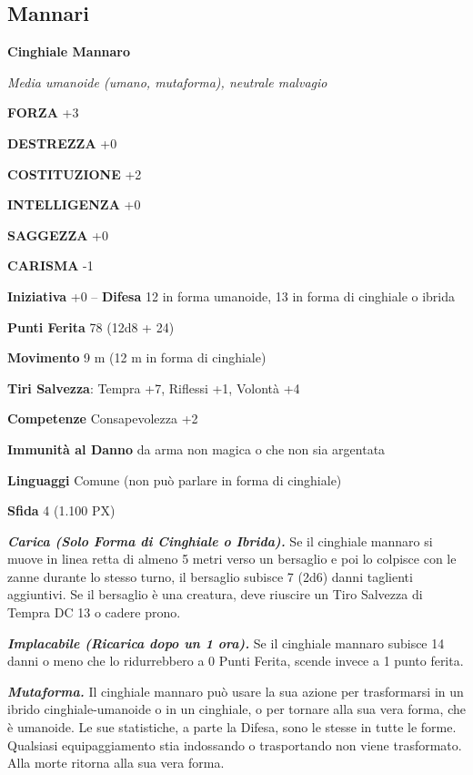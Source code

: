 \begin{multicols}{2}
\subsection{Mannari}

\medskip{}\textbf{Cinghiale Mannaro}

\textit{Media umanoide (umano, mutaforma), neutrale malvagio}

\textbf{FORZA} +3

\textbf{DESTREZZA} +0

\textbf{COSTITUZIONE} +2

\textbf{INTELLIGENZA} +0

\textbf{SAGGEZZA} +0

\textbf{CARISMA} -1

\textbf{Iniziativa} +0 -- \textbf{Difesa} 12 in forma umanoide, 13 in forma di cinghiale o ibrida

\textbf{Punti Ferita} 78 (12d8 + 24)

\textbf{Movimento} 9 m (12 m in forma di cinghiale)

\textbf{Tiri Salvezza}: Tempra +7, Riflessi +1, Volontà +4

\textbf{Competenze} Consapevolezza +2

\textbf{Immunità al Danno} da arma non magica o che non sia argentata

\textbf{Linguaggi} Comune (non può parlare in forma di cinghiale)

\textbf{Sfida} 4 (1.100 PX)

\textit{\textbf{Carica (Solo Forma di Cinghiale o Ibrida).}} Se il cinghiale mannaro si muove in linea retta di almeno 5 metri verso un bersaglio e poi lo colpisce con le zanne durante lo stesso turno, il bersaglio subisce 7 (2d6) danni taglienti aggiuntivi. Se il bersaglio è una creatura, deve riuscire un Tiro Salvezza di Tempra DC 13 o cadere prono.

\textit{\textbf{Implacabile (Ricarica dopo un 1 ora).}} Se il cinghiale mannaro subisce 14 danni o meno che lo ridurrebbero a 0 Punti Ferita, scende invece a 1 punto ferita.

\textit{\textbf{Mutaforma.}} Il cinghiale mannaro può usare la sua azione per trasformarsi in un ibrido cinghiale-umanoide o in un cinghiale, o per tornare alla sua vera forma, che è umanoide. Le sue statistiche, a parte la Difesa, sono le stesse in tutte le forme. Qualsiasi equipaggiamento stia indossando o trasportando non viene trasformato. Alla morte ritorna alla sua vera forma.


\end{multicols}

